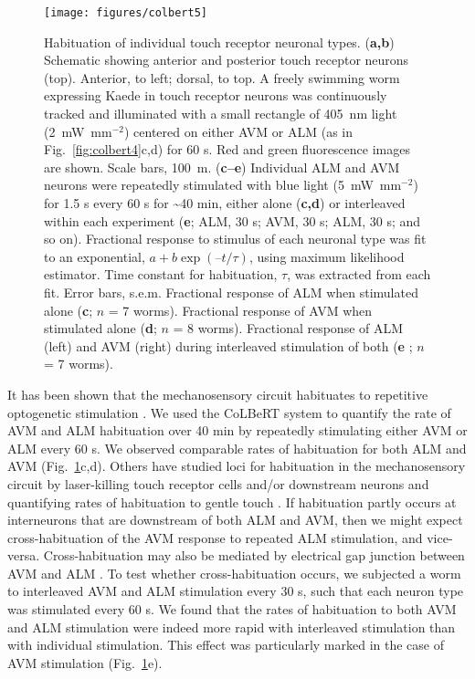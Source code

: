 \begin{figure} 
\texttt{[image: figures/colbert5]}
\caption[Habituation of individual touch receptor neuronal types.]{ Habituation of individual touch receptor neuronal types. (\textbf{a,b}) Schematic showing anterior and posterior touch receptor neurons (top). Anterior, to left; dorsal, to top. A freely swimming worm expressing Kaede in touch receptor neurons was continuously tracked and illuminated with a small rectangle of 405~nm light (2~mW~mm$^{-2}$) centered on either AVM or ALM (as in Fig.~\ref{fig:colbert4}c,d) for 60 s. Red and green fluorescence images are shown. Scale bars, 100~\textmu m. (\textbf{c–e}) Individual ALM and AVM neurons were repeatedly stimulated with blue light (5~mW~mm$^{-2}$) for 1.5 s every 60 s for \textasciitilde40 min, either alone (\textbf{c,d}) or interleaved within each experiment (\textbf{e}; ALM, 30 s; AVM, 30 s; ALM, 30 s; and so on). Fractional response to stimulus of each neuronal type was fit to an exponential, $a + b \exp(–t/\tau)$, using maximum likelihood estimator. Time constant for habituation, $\tau$, was extracted from each fit. Error bars, s.e.m. Fractional response of ALM when stimulated alone (\textbf{c}; $n$ = 7 worms). Fractional response of AVM when stimulated alone (\textbf{d}; $n$ = 8 worms). Fractional response of ALM (left) and AVM (right) during interleaved stimulation of both (\textbf{e} ; $n$ = 7 worms).\label{fig:colbert5}}
\end{figure}

It has been shown that the mechanosensory circuit habituates to repetitive optogenetic stimulation \citep{nagel_light_2005}. We used the CoLBeRT system to quantify the rate of AVM and ALM habituation over 40 min by repeatedly stimulating either AVM or ALM every 60 s. We observed comparable rates of habituation for both ALM and AVM (Fig.~\ref{fig:colbert5}c,d). Others have studied loci for habituation in the mechanosensory circuit by laser-killing touch receptor cells and/or downstream neurons and quantifying rates of habituation to gentle touch \citep{wyart_optogenetic_2009}. If habituation partly occurs at interneurons that are downstream of both ALM and AVM, then we might expect cross-habituation of the AVM response to repeated ALM stimulation, and vice-versa. Cross-habituation may also be mediated by electrical gap junction between AVM and ALM \citep{white_structure_1976}. To test whether cross-habituation occurs, we subjected a worm to interleaved AVM and ALM stimulation every 30 s, such that each neuron type was stimulated every 60 s. We found that the rates of habituation to both AVM and ALM stimulation were indeed more rapid with interleaved stimulation than with individual stimulation. This effect was particularly marked in the case of AVM stimulation (Fig.~\ref{fig:colbert5}e).

